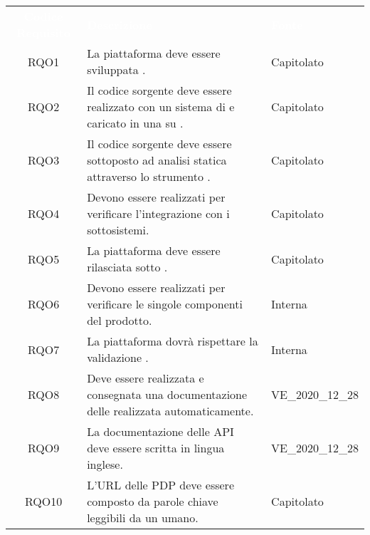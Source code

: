 \renewcommand{\arraystretch}{1.5}
\begin{longtable}{|c C{9.5cm} C{2.5cm}|} 
	
	\textcolor{white}{\textbf{Codice Requisito}}&
	\textcolor{white}{\textbf{Descrizione}}&
	\textcolor{white}{\textbf{Fonte}}\\	
	
	RQO1 & La piattaforma deve essere sviluppata . & Capitolato \\
	
	RQO2 & Il codice sorgente deve essere realizzato con un sistema di  e caricato in una  su \textit{}. & Capitolato \\

	RQO3 & Il codice sorgente deve essere sottoposto ad analisi statica attraverso lo strumento . & Capitolato \\

	RQO4 & Devono essere realizzati  per verificare l'integrazione con i sottosistemi. & Capitolato \\

	RQO5 & La piattaforma deve essere rilasciata sotto . & Capitolato  \\

	RQO6 & Devono essere realizzati  per verificare le singole componenti del prodotto. & Interna  \\

	RQO7 & La piattaforma dovrà rispettare la validazione . & Interna \\
	
	RQO8 & Deve essere realizzata e consegnata una documentazione delle  realizzata automaticamente. & VE\_2020\_12\_28 \\
	
	RQO9 & La documentazione delle API deve essere scritta in lingua inglese. & VE\_2020\_12\_28 \\
	
	RQO10 & L'URL delle PDP deve essere composto da parole chiave leggibili da un umano. & Capitolato \\
	
\end{longtable}
